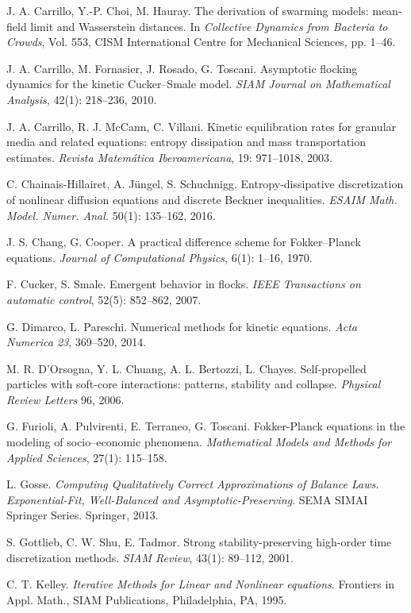 \documentclass[a4paper]{article}
\theoremstyle{remark}\newtheorem{remark}{Remark}
\begin{document}
\begin{thebibliography}{99}
J. A. Carrillo, Y.-P. Choi, M. Hauray. The derivation of swarming models: mean-field limit and Wasserstein distances. In \emph{Collective Dynamics from Bacteria to Crowds}, Vol. 553, CISM International Centre for Mechanical Sciences, pp. 1--46.

J. A. Carrillo, M. Fornasier, J. Rosado, G. Toscani. Asymptotic flocking dynamics for the kinetic Cucker--Smale model. \emph{SIAM Journal on Mathematical Analysis}, 42(1): 218--236, 2010.

J. A. Carrillo, R. J. McCann, C. Villani. Kinetic equilibration rates for granular media and related equations: entropy dissipation and mass transportation estimates. \emph{Revista Matem{\'a}tica Iberoamericana}, 19: 971--1018, 2003. 

C. Chainais-Hillairet, A. J\"ungel, S. Schuchnigg.
Entropy-dissipative discretization of nonlinear diffusion equations and discrete Beckner inequalities. {\em ESAIM Math. Model. Numer. Anal.} 50(1): 135--162, 2016. 

J. S.  Chang, G. Cooper. A practical difference scheme for Fokker--Planck equations. \emph{Journal of Computational Physics}, 6(1): 1--16, 1970.

F. Cucker, S. Smale. Emergent behavior in flocks. \emph{IEEE Transactions on automatic control}, 52(5): 852--862, 2007.

G. Dimarco, L. Pareschi. Numerical methods for kinetic equations. {\em Acta Numerica 23\/}, 369--520, 2014.

M. R. D'Orsogna, Y. L. Chuang, A. L. Bertozzi, L. Chayes. Self-propelled particles with soft-core interactions: patterns, stability and collapse. \emph{Physical Review Letters} 96, 2006.

 G. Furioli, A. Pulvirenti, E. Terraneo, G. Toscani. Fokker-Planck equations in the modeling of socio--economic phenomena. \emph{Mathematical Models and Methods for Applied Sciences}, 27(1): 115--158. 

L. Gosse. {\em Computing Qualitatively Correct Approximations of Balance Laws. {E}xponential-Fit, Well-Balanced and Asymptotic-Preserving}. SEMA SIMAI Springer Series. Springer, 2013.

S. Gottlieb, C. W. Shu, E. Tadmor. Strong stability-preserving high-order time discretization methods. \emph{SIAM Review}, 43(1): 89--112, 2001. 

C. T. Kelley. {\em Iterative Methods for Linear and Nonlinear equations}. Frontiers in Appl.
Math., SIAM Publications, Philadelphia, PA, 1995.


\end{thebibliography}
\end{document}
